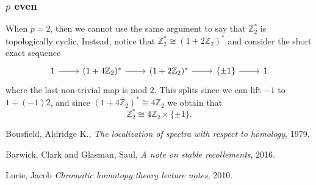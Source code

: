 \documentclass[a4paper]{article} %
\theoremstyle{definition}
\newcommand{\Z}{\mathbb{Z}}
\begin{document}
\subsubsection{$p$ even}

When $p=2$, then we cannot use the same argument to say that $\Z_2^*$ is topologically cyclic. Instead, notice that $\Z_2^* \cong (1 + 2\Z_2)^*$ and consider the short exact sequence
\[
\begin{tikzcd}
  1 \arrow{r} & (1 + 4\Z_2)^* \arrow{r} & (1+2\Z_2)^* \arrow{r} & \{\pm 1\} \rar & 1
\end{tikzcd}
\]
where the last non-trivial map is mod $2$. This splits since we can lift $-1$ to $1 + (-1)2$, and since $(1 + 4\Z_2)^* \cong 4\Z_2$ we obtain that
\[
\Z_2^* \cong 4\Z_2 \times \{\pm 1\}.
\]

\begin{thebibliography}{9}

  Bousfield, Aldridge K.,
  \textit{The localization of spectra with respect to homology},
  1979.

  Barwick, Clark and Glasman, Saul,
  \textit{A note on stable recollements},
  2016.

  Lurie, Jacob
  \textit{Chromatic homotopy theory lecture notes},
  2010.

\end{thebibliography}
\end{document}
